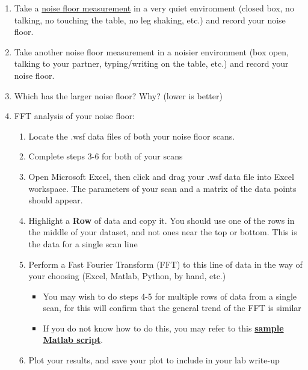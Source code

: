 \documentclass{../lab}
\begin{document}
\begin{enumerate}
    \item Take a \hyperref[subsec:MeasureNoiseFloor]{noise floor measurement} in a very quiet environment (closed box, no talking, no touching the table, no leg shaking, etc.) and record your noise floor.

    \item Take another noise floor measurement in a noisier environment (box open, talking to your partner, typing/writing on the table, etc.) and record your noise floor.

    \item Which has the larger noise floor? Why? (lower is better)

    \item FFT analysis of your noise floor:

    \begin{enumerate}
        \item Locate the .wsf data files of both your noise floor scans.

        \item Complete steps 3-6 for both of your scans

        \item Open Microsoft Excel, then click and drag your .wsf data file into Excel workspace.  The parameters of your scan and a matrix of the data points should appear.

        \item Highlight a \textbf{Row} of data and copy it.  You should use one of the rows in the middle of your dataset, and not ones near the top or bottom.  This is the data for a single scan line

        \item Perform a Fast Fourier Transform (FFT) to this line of data in the way of your choosing (Excel, Matlab, Python, by hand, etc.)
        \begin{itemize}
            \item You may wish to do steps 4-5 for multiple rows of data from a single scan, for this will confirm that the general trend of the FFT is similar
    
            \item If you do not know how to do this, you may refer to this \href{http://experimentationlab.berkeley.edu/sites/default/files/AFMImages/afm\_freq.m}{\textbf{sample Matlab script}}.
        \end{itemize}

        \item Plot your results, and save your plot to include in your lab write-up
    \end{enumerate}


\end{enumerate}
\end{document}
